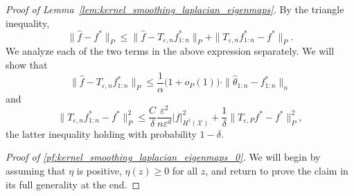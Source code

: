 \documentclass{article}
\newcommand{\1}{\mathbf{1}}
\newcommand{\mc}[1]{\mathcal{#1}}
\newcommand{\wh}[1]{\widehat{#1}}
\theoremstyle{definition}
\theoremstyle{remark}
\begin{document}
\begin{proof}[Proof of Lemma~\ref{lem:kernel_smoothing_laplacian_eigenmaps}]
	By the triangle inequality, 
	\begin{equation*}
	\|\wh{f} - f^{\ast}\|_P \leq \|\wh{f} - T_{\varepsilon,n}f^{\ast}_{1:n}\|_P + \|T_{\varepsilon,n}f^{\ast}_{1:n} - f^{\ast}\|_P.
	\end{equation*}
	We analyze each of the two terms in the above expression separately. We will show that
	\begin{equation}
	\label{pf:kernel_smoothing_laplacian_eigenmaps_0}
	\|\wh{f} - T_{\varepsilon,n}f^{\ast}_{1:n}\|_P \leq \frac{1}{\alpha}\bigl(1 + o_P(1)\bigr) \cdot \|\wh{\theta}_{1:n} - f^{\ast}_{1:n}\|_n
	\end{equation}
	and 
	\begin{equation}
	\label{pf:kernel_smoothing_laplacian_eigenmaps_0.5}
	\|T_{\varepsilon,n}f^{\ast}_{1:n} - f^{\ast}\|_P^2 \leq \frac{C}{\delta}\frac{\varepsilon^2}{n\varepsilon^d} |f|_{H^1(\mc{X})}^2 + \frac{1}{\delta}\|T_{\varepsilon,P}f^{\ast} - f^{\ast}\|_P^2,
	\end{equation}
	the latter inequality holding with probability $1 - \delta$.
	
	\textit{Proof of \eqref{pf:kernel_smoothing_laplacian_eigenmaps_0}.} We will begin by assuming that $\eta$ is positive, $\eta(z) \geq 0$ for all $z$, and return to prove the claim in its full generality at the end.
	

\end{proof}
\end{document}
